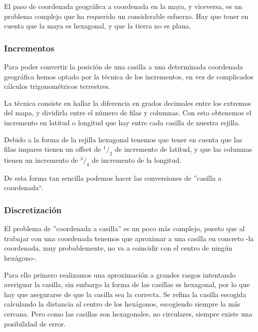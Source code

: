 El paso de coordenada geográfica a coordenada en la maya, y viceversa, es un
problema complejo que ha requerido un considerable esfuerzo. Hay que tener en
cuenta que la maya es hexagonal, y que la tierra no es plana.

\subsubsection*{Incrementos} \label{incrementos}

Para poder convertir la posición de una casilla a una determinada coordenada
geográfica hemos optado por la técnica de los incrementos, en vez de complicados
cálculos trigonométricos terrestres.

La técnica consiste en hallar la diferencia en grados decimales entre los
extremos del mapa, y dividirla entre el número de filas y columnas. Con esto
obtenemos el incremento en latitud o longitud que hay entre cada casilla de
nuestra rejilla.

Debido a la forma de la rejilla hexagonal tenemos que tener en cuenta que las
filas impares tienen un offset de \begin{math}^1/_2\end{math} de incremento de
latitud, y que las columnas tienen un incremento de \begin{math}^3/_4\end{math}
de incremento de la longitud.

De esta forma tan sencilla podemos hacer las conversiones de ''casilla a
coordenada``.

\subsubsection*{Discretización}

El problema de ''coordenada a casilla'' es un poco más complejo, puesto que al
trabajar con una coordenada tenemos que aproximar a una casilla en concreto
-la coordenada, muy probablemente, no va a coincidir con el centro de ningún
hexágono-.

Para ello primero realizamos una aproximación a grandes rasgos intentando
averiguar la casilla, sin embargo la forma de las casillas es hexagonal, por lo
que hay que asegurarse de que la casilla sea la correcta. Se refina la casilla
escogida calculando la distancia al centro de los hexágonos, escogiendo siempre
la más cercana. Pero como las casillas son hexagonales, no circulares, siempre
existe una posibilidad de error.

